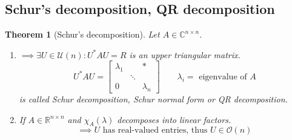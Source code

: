 \documentclass{article}
\newcounter{lecref}[section]
\numberwithin{lecref}{section}
\newtheorem{theorem}[lecref]{Theorem}
\begin{document}
\subsection{Schur's decomposition, QR decomposition}

\begin{theorem}[Schur's decomposition] %
  Let $A \in \mathbb C^{n \times n}$.
  \begin{enumerate}
    \item $\implies \exists U \in \mathcal U(n): U^* AU = R$ is an upper triangular matrix.
      \[ U^* AU = \begin{bmatrix} \lambda_1 & & * \\ & \ddots & \\ 0 & & \lambda_n \end{bmatrix} \qquad \lambda_i = \text{ eigenvalue of } A \]
      is called \emph{Schur decomposition}, \emph{Schur normal form} or \emph{QR decomposition}.
    \item If $A \in \mathbb R^{n \times n}$ and $\chi_A(\lambda)$ decomposes into linear factors.
      \[ \implies U \text{ has real-valued entries, thus } U \in \mathcal O(n) \]
  \end{enumerate}
\end{theorem}
\end{document}
